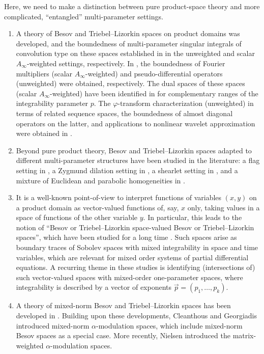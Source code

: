 \documentclass[11pt, reqno]{amsart}
\theoremstyle{definition}
\theoremstyle{remark}
\numberwithin{equation}{section}
\newcommand{\vp}{\vec p}
\begin{document}
Here, we need to make a distinction between pure product-space theory and more complicated, ``entangled'' multi-parameter settings.
\begin{enumerate}[\rm(a)]
\item\label{pure} A theory of Besov and Triebel--Lizorkin spaces on product
domains was developed, and the boundedness of multi-parameter
singular integrals of convolution type on these spaces established
in \cite{DLM10,LuZhu13} in the unweighted and scalar $A_\infty$-weighted
settings, respectively. In \cite{CLL16,Xu22}, the boundedness of Fourier
multipliers (scalar $A_\infty$-weighted) and pseudo-differential operators
(unweighted) were obtained, respectively. The dual spaces of these spaces
(scalar $A_\infty$-weighted) have been identified in \cite{DCN19,DingZhu17}
for complementary ranges of the integrability parameter $p$.
The $\varphi$-transform characterization (unweighted)
in terms of related sequence spaces, the boundedness of
almost diagonal operators on the latter, and applications
to nonlinear wavelet approximation were obtained in \cite{GKP21}.

\item\label{mixed} Beyond pure product theory, Besov and Triebel--Lizorkin spaces adapted to different multi-parameter structures have been studied in the literature: a flag setting in \cite{DLM10,LiaoLiu14,Yang09}, a Zygmund dilation setting in \cite{LiaoLiu13}, a shearlet setting in \cite{Vera13}, and a mixture of Euclidean and parabolic homogeneities in \cite{Ding14,DingLu16,DLZ16,Tan18,Tan20}.

\item\label{vector} It is a well-known point-of-view to
interpret functions of variables $(x,y)$ on a product domain
as vector-valued functions of, say, $x$ only, taking values
in a space of functions of the other variable $y$.
In particular, this leads to the notion of
``Besov or Triebel--Lizorkin space-valued Besov
or Triebel--Lizorkin spaces'',
which have been studied for a long time
\cite{Berko85,DHP07,DenkKaip13,Linde21,Weid05}.
Such spaces arise as boundary traces of Sobolev spaces with
mixed integrability in space and time variables,
which are relevant for mixed order systems of partial differential equations.
A recurring theme in these studies is identifying (intersections of)
such vector-valued spaces with mixed-order one-parameter spaces,
where integrability is described by a vector of exponents $\vp=(p_1,\ldots,p_k)$.

\item A theory of mixed-norm Besov and Triebel--Lizorkin spaces has been developed in \cite{cgn17,cgn19a,cgn19b,gjn17,gn16,nie23}.
Building upon these developments, Cleanthous and Georgiadis \cite{cg20} introduced  mixed-norm $\alpha$-modulation spaces, which include mixed-norm Besov spaces as a special case.
More recently, Nielsen \cite{nie25a} introduced the matrix-weighted $\alpha$-modulation spaces.
\end{enumerate}
\end{document}
